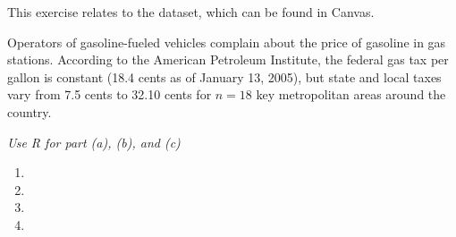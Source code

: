 This exercise relates to the  dataset, which can be found in Canvas.

\nl Operators of gasoline-fueled vehicles complain about the price of gasoline in gas stations. According to
the American Petroleum Institute, the federal gas tax per gallon is constant (18.4 cents as of January
13, 2005), but state and local taxes vary from 7.5 cents to 32.10 cents for $n = 18$ key metropolitan areas
around the country.

\nl \textit{Use R for part (a), (b), and (c)}

\begin{enumerate}
    \item \newpage
    \item \vspace{0.3in}
    \item \vspace{0.3in}
    \item 
\end{enumerate}